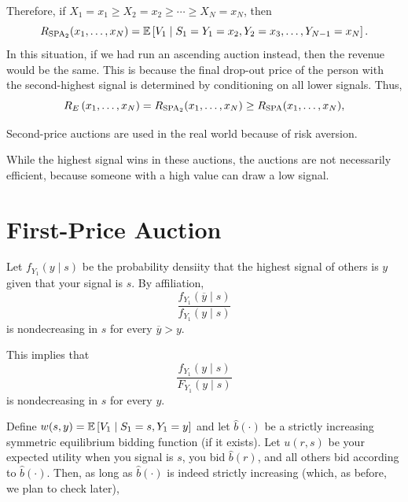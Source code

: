 Therefore, if $X_1=  x_1 \ge X_2 = x_2 \ge \cdots \ge X_N = x_N$, then \[
	R_{\text{SPA}_2}(x_1,\ldots,x_N) = \mathbb{E}\left[V_1 \mid S_1 = Y_1 = x_2, Y_2 = x_3, \ldots,Y_{N-1}=x_N\right] 
.\] In this situation, if we had run an ascending auction instead, then the revenue would be the same. This is because the final drop-out price of the person with the second-highest signal is determined by conditioning on all lower signals. Thus, \[
	R_E\left( x_1,\ldots,x_N \right) = R_{\text{SPA}_2}(x_1,\ldots,x_N) \ge R_{\text{SPA}}(x_1,\ldots,x_N)	
,\]

\begin{conj}
	Second-price auctions are used in the real world because of risk aversion.
\end{conj}

While the highest signal wins in these auctions, the auctions are not necessarily efficient, because someone with a high value can draw a low signal.

\section{First-Price Auction}
Let $f_{Y_1}(y\mid s)$ be the probability densiity that the highest signal of others is $y$ given that your signal is $s$. By affiliation, \[
	\frac{f_{Y_1}(\overline{y} \mid s)}{f_{Y_1}(y \mid s)}
\] is nondecreasing in $s$ for every $\overline{y} > y$. 

This implies that
\begin{equation} \label{2-12-0}
	\frac{f_{Y_1}(y \mid s)}{F_{Y_1}(y \mid s)}
\end{equation}
is nondecreasing in $s$ for every $y$.

Define $w(s,y) = \mathbb{E}\left[V_1 \mid S_1=s, Y_1 = y\right] $ and let $\hat{b}(\cdot )$ be a strictly increasing symmetric equilibrium bidding function (if it exists). Let $u(r,s)$ be your expected utility when you signal is $s$, you bid $\hat{b}(r)$, and all others bid according to $\hat{b}(\cdot )$. Then, as long as $\hat{b}(\cdot )$ is indeed strictly increasing (which, as before, we plan to check later), 

